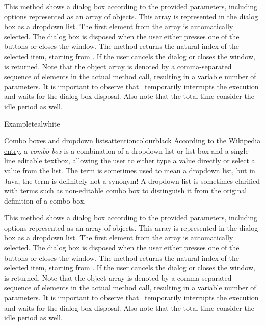 \begin{description}
This method shows a dialog box according to the provided parameters, including options represented as an array of  objects. This array is represented in the dialog box as a dropdown list. The first element from the array is automatically selected. The dialog box is disposed when the user either presses one of the buttons or closes the window. The method returns the natural index of the selected item, starting from . If the user cancels the dialog or closes the window,  is returned.  Note that the object array is denoted by a comma-separated sequence of elements in the actual method call, resulting in a variable number of parameters. It is important to observe that \arara\ temporarily interrupts the execution and waits for the dialog box disposal. Also note that the total time consider the idle period as well.

\begin{codebox}{Example}{teal}{\icnote}{white}
\end{codebox}

\begin{messagebox}{Combo boxes and dropdown lists}{attentioncolour}{\icattention}{black}
According to the \href{https://en.wikipedia.org/wiki/Combo_box}{Wikipedia entry}, a \emph{combo box} is a combination of a dropdown list or list box and a single line editable textbox, allowing the user to either type a value directly or select a value from the list. The term is sometimes used to mean a dropdown list, but in Java, the term is definitely not a synonym! A dropdown list is sometimes clarified with terms such as non-editable combo box to distinguish it from the original definition of a combo box.
\end{messagebox}

\item[\mddbox{C}{R}{\parbox{0.49\textwidth}{showDropdown(int icon, String title,\\\hspace*{1em} String text, Object... options)}}{int}]

This method shows a dialog box according to the provided parameters, including options represented as an array of  objects. This array is represented in the dialog box as a dropdown list. The first element from the array is automatically selected. The dialog box is disposed when the user either presses one of the buttons or closes the window. The method returns the natural index of the selected item, starting from . If the user cancels the dialog or closes the window,  is returned.  Note that the object array is denoted by a comma-separated sequence of elements in the actual method call, resulting in a variable number of parameters. It is important to observe that \arara\ temporarily interrupts the execution and waits for the dialog box disposal. Also note that the total time consider the idle period as well.


\end{description}
